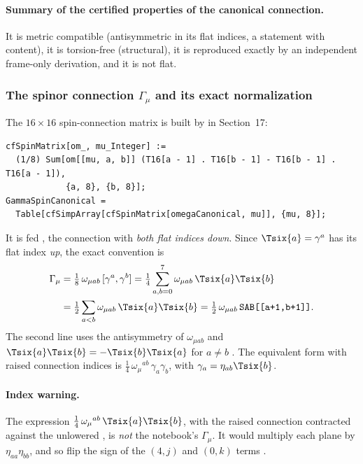 \paragraph{Summary of the certified properties of the canonical connection.} It is metric
compatible (antisymmetric in its flat indices, a statement with content), it is torsion-free
(structural), it is reproduced exactly by an independent frame-only derivation, and it is not
flat.

\subsubsection{The spinor connection \texorpdfstring{$\Gamma_\mu$}{Gamma-mu} and its exact normalization}
\label{csc:spinmatrix}\label{sec:3.8.7}

The $16\times16$ spin-connection matrix is built by  in Section~17:

{\scriptsize
\begin{verbatim}
cfSpinMatrix[om_, mu_Integer] :=
  (1/8) Sum[om[[mu, a, b]] (T16[a - 1] . T16[b - 1] - T16[b - 1] . T16[a - 1]),
            {a, 8}, {b, 8}];
GammaSpinCanonical =
  Table[cfSimpArray[cfSpinMatrix[omegaCanonical, mu]], {mu, 8}];
\end{verbatim}
}

It is fed , the connection with \emph{both flat indices down}. Since
$\Tsix{a}=\gamma^a$ has its flat index \emph{up}, the exact convention is
\begin{equation}
\begin{aligned}
  \Gamma_\mu&=\tfrac18\,\omega_{\mu ab}\,[\gamma^a,\gamma^b]
   =\tfrac14\sum_{a,b=0}^{7}\omega_{\mu ab}\,\Tsix{a}\Tsix{b}\\
  &=\tfrac12\sum_{a<b}\omega_{\mu ab}\,\Tsix{a}\Tsix{b}
   =\tfrac12\,\omega_{\mu ab}\,\texttt{SAB[[a+1,b+1]]} .
\end{aligned}
\end{equation}
The second line uses the antisymmetry of $\omega_{\mu ab}$ and $\Tsix{a}\Tsix{b}=-\Tsix{b}\Tsix{a}$
for $a\neq b$ \cfderived. The equivalent form with raised connection indices is
$\tfrac14\,\omega_\mu{}^{ab}\,\gamma_a\gamma_b$, with $\gamma_a=\eta_{ab}\Tsix{b}$.

\paragraph{Index warning.} The expression $\tfrac14\,\omega_\mu{}^{ab}\,\Tsix{a}\Tsix{b}$, with the
raised connection contracted against the unlowered , is \emph{not} the notebook's
$\Gamma_\mu$. It would multiply each plane by $\eta_{aa}\eta_{bb}$, and so flip the sign of the
$(4,j)$ and $(0,k)$ terms \cfderived.

